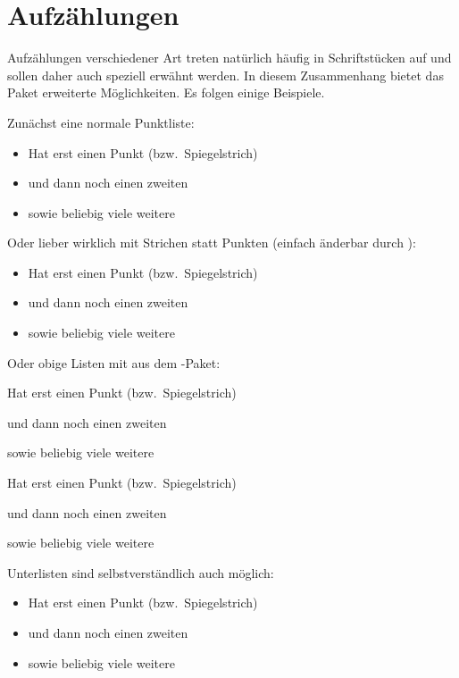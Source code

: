 \section{Aufzählungen}
\label{sec:Aufzaehlungen}
%
Aufzählungen verschiedener Art treten natürlich häufig in Schriftstücken auf und sollen daher auch speziell
erwähnt werden. In diesem Zusammenhang bietet das Paket  erweiterte
Möglichkeiten. Es folgen einige Beispiele.
%

Zunächst eine normale Punktliste:
\begin{itemize}
\item Hat erst einen Punkt (bzw.~Spiegelstrich)
\item und dann noch einen zweiten
\item sowie beliebig viele weitere
\end{itemize}

Oder lieber wirklich mit Strichen statt Punkten (einfach änderbar durch ):
%
\begin{itemize}[\quad---]
\item Hat erst einen Punkt (bzw.~Spiegelstrich)
\item und dann noch einen zweiten
\item sowie beliebig viele weitere
\end{itemize}

Oder obige Listen mit  aus dem -Paket:
\begin{compactitem}
\item Hat erst einen Punkt (bzw.~Spiegelstrich)
\item und dann noch einen zweiten
\item sowie beliebig viele weitere
\end{compactitem}

\begin{compactitem}[\quad---]
\item Hat erst einen Punkt (bzw.~Spiegelstrich)
\item und dann noch einen zweiten
\item sowie beliebig viele weitere
\end{compactitem}


Unterlisten sind selbstverständlich auch möglich:
\begin{itemize}
\item Hat erst einen Punkt (bzw.~Spiegelstrich)
\item und dann noch einen zweiten
\item sowie beliebig viele weitere
\end{itemize}


